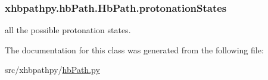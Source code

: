 \hypertarget{classxhbpathpy_1_1hb_path_1_1_hb_path_aac00fb2999e064916005328fd4032763}{
\subsubsection[{protonation\-States}]{\setlength{\rightskip}{0pt plus 5cm}xhbpathpy.\-hb\-Path.\-Hb\-Path.\-protonation\-States}}\label{classxhbpathpy_1_1hb_path_1_1_hb_path_aac00fb2999e064916005328fd4032763}


all the possible protonation states. 



The documentation for this class was generated from the following file\-:\begin{DoxyCompactItemize}
\item 
src/xhbpathpy/\hyperlink{hb_path_8py}{hb\-Path.\-py}\end{DoxyCompactItemize}
